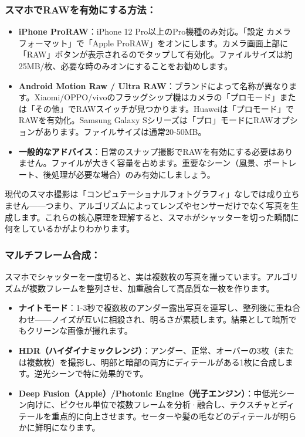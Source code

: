 \subsubsection*{スマホでRAWを有効にする方法：}

\begin{itemize}
  \item \textbf{iPhone ProRAW}：iPhone 12 Pro以上のPro機種のみ対応。「設定 カメラ フォーマット」で「Apple ProRAW」をオンにします。カメラ画面上部に「RAW」ボタンが表示されるのでタップして有効化。ファイルサイズは約25MB/枚、必要な時のみオンにすることをお勧めします。
  \item \textbf{Android Motion Raw / Ultra RAW}：ブランドによって名称が異なります。Xiaomi/OPPO/vivoのフラッグシップ機はカメラの「プロモード」または「その他」でRAWスイッチが見つかります。Huaweiは「プロモード」でRAWを有効化。Samsung Galaxy Sシリーズは「プロ」モードにRAWオプションがあります。ファイルサイズは通常20-50MB。
  \item \textbf{一般的なアドバイス}：日常のスナップ撮影でRAWを有効にする必要はありません。ファイルが大きく容量を占めます。重要なシーン（風景、ポートレート、後処理が必要な場合）のみ有効にしましょう。
\end{itemize}


現代のスマホ撮影は「コンピュテーショナルフォトグラフィ」なしでは成り立ちません——つまり、アルゴリズムによってレンズやセンサーだけでなく写真を生成します。これらの核心原理を理解すると、スマホがシャッターを切った瞬間に何をしているかがよりわかります。

\subsubsection*{マルチフレーム合成：}

スマホでシャッターを一度切ると、実は複数枚の写真を撮っています。アルゴリズムが複数フレームを整列させ、加重融合して高品質な一枚を作ります。

\begin{itemize}
  \item \textbf{ナイトモード}：1-3秒で複数枚のアンダー露出写真を連写し、整列後に重ね合わせ——ノイズが互いに相殺され、明るさが累積します。結果として暗所でもクリーンな画像が撮れます。
  \item \textbf{HDR（ハイダイナミックレンジ）}：アンダー、正常、オーバーの3枚（または複数枚）を撮影し、明部と暗部の両方にディテールがある1枚に合成します。逆光シーンで特に効果的です。
  \item \textbf{Deep Fusion（Apple）/Photonic Engine（光子エンジン）}：中低光シーン向けに、ピクセル単位で複数フレームを分析·融合し、テクスチャとディテールを重点的に向上させます。セーターや髪の毛などのディテールが明らかに鮮明になります。
\end{itemize}

